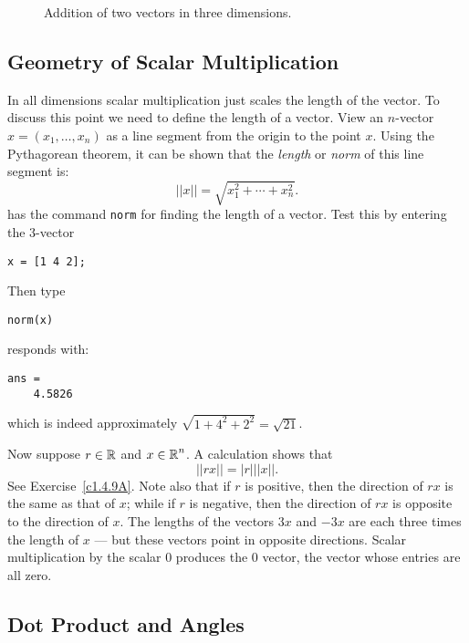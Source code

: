 \documentclass{ximera}
\begin{document}
\begin{figure}[htb]
         \centerline{%
         }
         \caption{Addition of two vectors in three dimensions.}
         \label{F:vec3}
\end{figure}


\subsection*{Geometry of Scalar Multiplication}

In all dimensions scalar multiplication just scales the length of the vector.  To
discuss this point we need to define the length of a vector.
View an $n$-vector $x=(x_1,\ldots,x_n)$ as a line segment from
the origin to the point $x$.  Using the Pythagorean theorem, it can
be shown that the {\em length\/} 
or {\em norm\/} of this line segment is:
\[
||x||  = \sqrt{x_1^2 + \cdots + x_n^2}.
\] \index{\computer:$||\cdot|| $}
\Matlab has the command {\tt norm} for finding the length of a
vector.  Test this by entering the $3$-vector
\begin{verbatim}
x = [1 4 2];
\end{verbatim}
Then type
\begin{verbatim}
norm(x)
\end{verbatim}  
\Matlab responds with:
\begin{verbatim}
ans =
    4.5826
\end{verbatim}
which is indeed approximately $\sqrt{1+4^2+2^2} = \sqrt{21}$.

Now suppose $r\in\mbox{$\Bbb{R}$}$ and $x\in\mbox{$\Bbb{R}$}^n$.  A calculation shows that
\begin{equation}  \label{E:lengths}
||rx||  = |r| ||x||.
\end{equation}
See Exercise~\ref{c1.4.9A}.  Note also that if $r$ is positive, 
then the direction of $rx$
is the same as that of $x$; while if $r$ is negative, then the
direction of $rx$ is opposite to the direction of $x$.  The
lengths of the vectors $3x$ and $-3x$ are each three times the
length of $x$ --- but these vectors point in opposite
directions.  Scalar multiplication by the scalar $0$ produces
the $0$ vector, the vector whose entries are all zero.

\subsection*{Dot Product and Angles}
\end{document}
